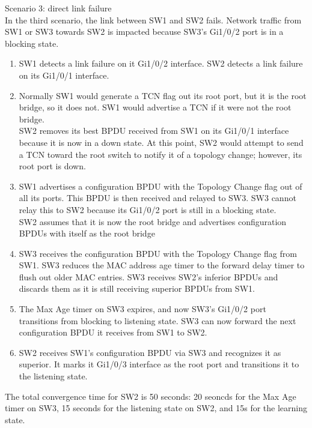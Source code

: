 \documentclass{article}
\begin{document}
	Scenario 3: direct link failure\\
	In the third scenario, the link between SW1 and SW2 fails. Network traffic from SW1 or SW3 towards SW2 is impacted because SW3's Gi1/0/2 port is in a blocking state.
		\begin{enumerate}
			\item SW1 detects a link failure on it Gi1/0/2 interface. SW2 detects a link failure on its Gi1/0/1 interface.
			\item Normally SW1 would generate a TCN flag out its root port, but it is the root bridge, so it does not. SW1 would advertise a TCN if it were not the root bridge.\\
				SW2 removes its best BPDU received from SW1 on its Gi1/0/1 interface because it is now in a down state. At this point, SW2 would attempt to send a TCN toward the root switch to notify it of a topology change; however, its root port is down.
			\item SW1 advertises a configuration BPDU with the Topology Change flag out of all its ports. This BPDU is then received and relayed to SW3. SW3 cannot relay this to SW2 because its Gi1/0/2 port is still in a blocking state.\\
				SW2 assumes that it is now the root bridge and advertises configuration BPDUs with itself as the root bridge
			\item SW3 receives the configuration BPDU with the Topology Change flag from SW1. SW3 reduces the MAC address age timer to the forward delay timer to flush out older MAC entries. SW3 receives SW2's inferior BPDUs and discards them as it is still receiving superior BPDUs from SW1. 
			\item The Max Age timer on SW3 expires, and now SW3's Gi1/0/2 port transitions from blocking to listening state. SW3 can now forward the next configuration BPDU it receives from SW1 to SW2.
			\item SW2 receives SW1's configuration BPDU via SW3 and recognizes it as superior. It marks it Gi1/0/3 interface as the root port and transitions it to the listening state.
		\end{enumerate}
			The total convergence time for SW2 is 50 seconds: 20 seoncds for the Max Age timer on SW3, 15 seconds for the listening state on SW2, and 15s for the learning state.\\
\end{document}
